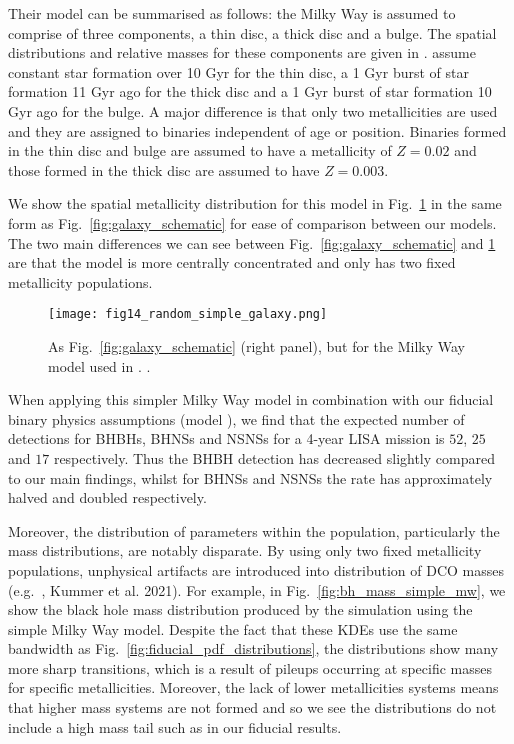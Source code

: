 Their model can be summarised as follows: the Milky Way is assumed to comprise of three components, a thin disc, a thick disc and a bulge. The spatial distributions and relative masses for these components are given in \citet{McMillan+2011}. \citet{Breivik+2020} assume constant star formation over 10 Gyr for the thin disc, a 1 Gyr burst of star formation 11 Gyr ago for the thick disc and a 1 Gyr burst of star formation 10 Gyr ago for the bulge. A major difference is that only two metallicities are used and they are assigned to binaries independent of age or position. Binaries formed in the thin disc and bulge are assumed to have a metallicity of $Z = 0.02$ and those formed in the thick disc are assumed to have $Z = 0.003$.

We show the spatial metallicity distribution for this model in Fig.~\ref{fig:simple_mw} in the same form as Fig.~\ref{fig:galaxy_schematic} for ease of comparison between our models. The two main differences we can see between Fig.~\ref{fig:galaxy_schematic} and \ref{fig:simple_mw} are that the \citet{Breivik+2020} model is more centrally concentrated and only has two fixed metallicity populations.

\begin{figure}[htb]
    \centering
    \texttt{[image: fig14\_random\_simple\_galaxy.png]}
    \caption{As Fig.~\ref{fig:galaxy_schematic} (right panel), but for the Milky Way model used in \citet{Breivik+2020}.  \href{https://github.com/TomWagg/detecting-DCOs-in-LISA/blob/main/paper/figures/fig14_random_simple_galaxy.png}{\faFileImage} \href{https://github.com/TomWagg/detecting-DCOs-in-LISA/blob/main/paper/figure_notebooks/galaxy_creation_station.ipynb}{\faBook}.}
    \label{fig:simple_mw}
\end{figure}

When applying this simpler Milky Way model in combination with our fiducial binary physics assumptions (model \modFid{}), we find that the expected number of detections for BHBHs, BHNSs and NSNSs for a 4-year LISA mission is $52$, $25$ and $17$ respectively. Thus the BHBH detection has decreased slightly compared to our main findings, whilst for BHNSs and NSNSs the rate has approximately halved and doubled respectively.

Moreover, the distribution of parameters within the population, particularly the mass distributions, are notably disparate. By using only two fixed metallicity populations, unphysical artifacts are introduced into distribution of DCO masses (e.g.\ \citealt{Dominik+2015, Neijssel+2019}, Kummer et al. 2021). For example, in Fig.~\ref{fig:bh_mass_simple_mw}, we show the black hole mass distribution produced by the simulation using the simple Milky Way model. Despite the fact that these KDEs use the same bandwidth as Fig.~\ref{fig:fiducial_pdf_distributions}, the distributions show many more sharp transitions, which is a result of pileups occurring at specific masses for specific metallicities. Moreover, the lack of lower metallicities systems means that higher mass systems are not formed and so we see the distributions do not include a high mass tail such as in our fiducial results.

